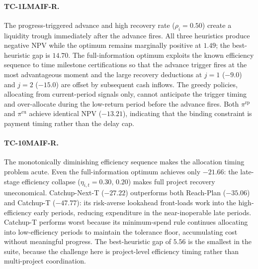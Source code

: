 \paragraph{TC-1LMAIF-R.}
The progress-triggered advance and high recovery rate ($\rho_i =
0.50$) create a liquidity trough immediately after the advance fires.
All three heuristics produce negative NPV while the optimum remains
marginally positive at $1.49$; the best-heuristic gap is $14.70$.
The full-information optimum exploits the known efficiency sequence
to time milestone certifications so that the advance trigger fires
at the most advantageous moment and the large recovery deductions at
$j = 1$ ($-9.0$) and $j = 2$ ($-15.0$) are offset by subsequent
cash inflows. The greedy policies, allocating from current-period
signals only, cannot anticipate the trigger timing and over-allocate
during the low-return period before the advance fires. Both
$\pi^{\mathrm{rp}}$ and $\pi^{\mathrm{cu}}$ achieve identical NPV
($-13.21$), indicating that the binding constraint is payment timing
rather than the delay cap.

\paragraph{TC-10MAIF-R.}
The monotonically diminishing efficiency sequence makes the
allocation timing problem acute. Even the full-information optimum
achieves only $-21.66$: the late-stage efficiency collapse
($\eta_{i,t} = 0.30,\, 0.20$) makes full project recovery
uneconomical. Catchup-Next-T ($-27.22$) outperforms both Reach-Plan
($-35.06$) and Catchup-T ($-47.77$): its risk-averse lookahead
front-loads work into the high-efficiency early periods, reducing
expenditure in the near-inoperable late periods. Catchup-T performs
worst because its minimum-spend rule continues allocating into
low-efficiency periods to maintain the tolerance floor, accumulating
cost without meaningful progress. The best-heuristic gap of $5.56$ is
the smallest in the suite, because the challenge here is project-level
efficiency timing rather than multi-project coordination.


